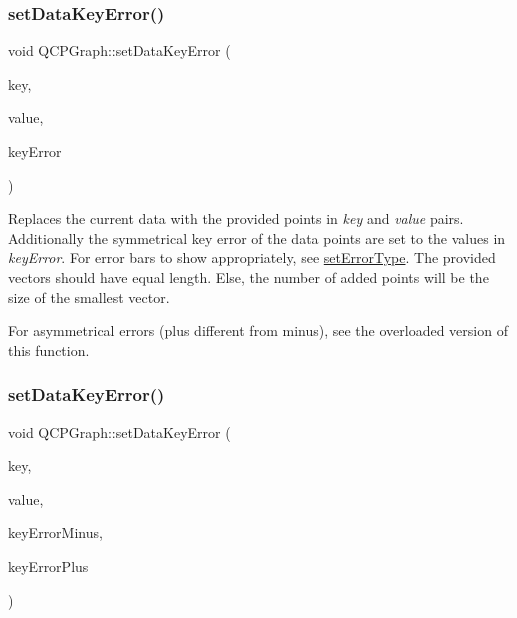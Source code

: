 \subsubsection{\texorpdfstring{set\+Data\+Key\+Error()}{setDataKeyError()}\hspace{0.1cm}{\footnotesize\ttfamily [1/2]}}
{\footnotesize\ttfamily void Q\+C\+P\+Graph\+::set\+Data\+Key\+Error (\begin{DoxyParamCaption}\item[{const Q\+Vector$<$ double $>$ \&}]{key,  }\item[{const Q\+Vector$<$ double $>$ \&}]{value,  }\item[{const Q\+Vector$<$ double $>$ \&}]{key\+Error }\end{DoxyParamCaption})}

Replaces the current data with the provided points in {\itshape key} and {\itshape value} pairs. Additionally the symmetrical key error of the data points are set to the values in {\itshape key\+Error}. For error bars to show appropriately, see \mbox{\hyperlink{class_q_c_p_graph_ac3614d799c3894f2bc646e99c7f73d38}{set\+Error\+Type}}. The provided vectors should have equal length. Else, the number of added points will be the size of the smallest vector.

For asymmetrical errors (plus different from minus), see the overloaded version of this function. \mbox{\label{class_q_c_p_graph_ac15c749c5fedf740d5692c6fe67143b8}} 
\subsubsection{\texorpdfstring{set\+Data\+Key\+Error()}{setDataKeyError()}\hspace{0.1cm}{\footnotesize\ttfamily [2/2]}}
{\footnotesize\ttfamily void Q\+C\+P\+Graph\+::set\+Data\+Key\+Error (\begin{DoxyParamCaption}\item[{const Q\+Vector$<$ double $>$ \&}]{key,  }\item[{const Q\+Vector$<$ double $>$ \&}]{value,  }\item[{const Q\+Vector$<$ double $>$ \&}]{key\+Error\+Minus,  }\item[{const Q\+Vector$<$ double $>$ \&}]{key\+Error\+Plus }\end{DoxyParamCaption})}

